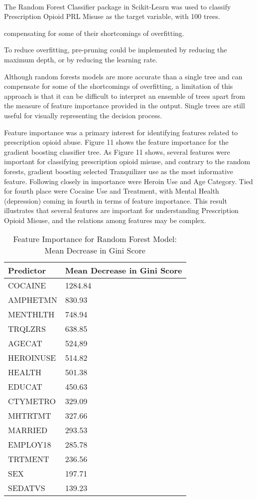 \\\documentclass[sigconf]{acmart}
\begin{document}
The Random Forest Classifier package in Scikit-Learn was used to classify
Prescription Opioid PRL Misuse as the target variable, with 100 trees. 

compensating for some of their shortcomings of overfitting.

To reduce overfitting, pre-pruning could be implemented by reducing the 
maximum depth, or by reducing 
the learning rate. 

Although random forests models are more accurate than a single tree and can
compensate for some of the shortcomings of overfitting, a limitation of this 
approach is that it can be difficult to interpret an ensemble of trees apart 
from the measure of feature importance provided in the output. Single trees 
are still useful for visually representing the decision process.

Feature importance was a primary interest for identifying features related to
prescription opioid abuse. Figure 11 shows the feature importance for the 
gradient boosting classifier tree. As Figure 11 shows, several features were 
important for classifying prescription opioid misuse, and contrary to the 
random forests, gradient boosting selected Tranquilizer use as the most 
informative feature. Following closely in importance were Heroin Use and Age 
Category. Tied for fourth place were Cocaine Use and Treatment, with Mental 
Health (depression) coming in fourth in terms of feature importance. This 
result illustrates that several features are important for understanding 
Prescription Opioid Misuse, and the relations among features may be complex.


\begin{table}
  \caption{Feature Importance for Random Forest Model: Mean Decrease in Gini
  Score}
  \label{tab:freq}
  \begin{tabular}{ll}
    \toprule
    Predictor&  Mean Decrease in Gini Score  \\    
    \midrule
    COCAINE   & 1284.84 \\
    AMPHETMN  &  830.93 \\
    MENTHLTH  &  748.94 \\ 
    TRQLZRS   &  638.85 \\
    AGECAT    &  524,89 \\
    HEROINUSE &  514.82 \\
    HEALTH    &  501.38 \\
    EDUCAT    &  450.63 \\
    CTYMETRO  &  329.09 \\
    MHTRTMT   &  327.66 \\
    MARRIED   &  293.53 \\
    EMPLOY18  &  285.78 \\ 
    TRTMENT   &  236.56 \\
    SEX       &  197.71 \\
    SEDATVS   &  139.23 \\
    \bottomrule
  \end{tabular}
\end{table}
\end{document}
